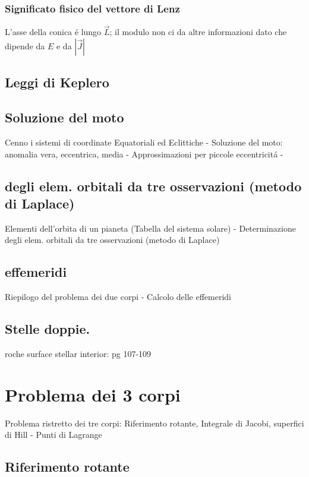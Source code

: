 \documentclass[oneside,12pt,fleqn]{memoir}
\begin{document}
\subsection{Significato fisico del vettore di Lenz}

L'asse della conica \'e lungo $\vec{L}$; il modulo non ci da altre informazioni dato che dipende da $E$ e da $|\vec{J}|$ 



\section{Leggi di Keplero}



\section{Soluzione del moto}
Cenno i sistemi di coordinate Equatoriali ed Eclittiche - Soluzione del moto: anomalia vera, eccentrica, media - Approssimazioni per piccole eccentricit\'a - 

\section{ degli elem. orbitali da tre osservazioni (metodo di Laplace) }
Elementi dell'orbita di un pianeta (Tabella del sistema solare) - Determinazione degli elem. orbitali da tre osservazioni (metodo di Laplace) 

\section{effemeridi}
Riepilogo del problema dei due corpi - Calcolo delle effemeridi


\section{Stelle doppie.}
\begin{todo}{roche surface}
stellar interior: pg 107-109
\end{todo}


\chapter{Problema dei 3 corpi}


Problema ristretto dei tre corpi: Riferimento rotante, Integrale di Jacobi, superfici di Hill - Punti di Lagrange 
\PartialToc

\section{Riferimento rotante}
\end{document}
